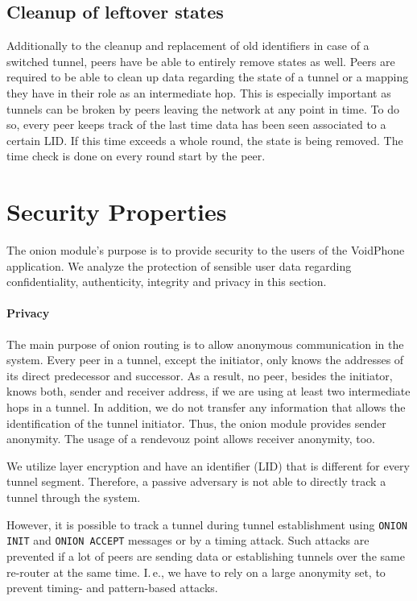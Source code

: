 \documentclass[paper=letter, fontsize=12pt]{article}
\begin{document}
\subsection{Cleanup of leftover states}
\label{sec:function:cleanup}
Additionally to the cleanup and replacement of old identifiers in case of a switched tunnel, peers have be able to entirely remove states as well. Peers are required to be able to clean up data regarding the state of a tunnel or a mapping they have in their role as an intermediate hop. This is especially important as tunnels can be broken by peers leaving the network at any point in time. To do so, every peer keeps track of the last time data has been seen associated to a certain LID. If this time exceeds a whole round, the state is being removed. The time check is done on every round start by the peer.

\section{Security Properties}
The onion module's purpose is to provide security to the users of the VoidPhone application.
We analyze the protection of sensible user data regarding confidentiality, authenticity, integrity and privacy in this section.

\paragraph{Privacy}
The main purpose of onion routing is to allow anonymous communication in the system.
Every peer in a tunnel, except the initiator, only knows the addresses of its direct predecessor and successor.
As a result, no peer, besides the initiator, knows both, sender and receiver address, if we are using at least two intermediate hops in a tunnel.
In addition, we do not transfer any information that allows the identification of the tunnel initiator.
Thus, the onion module provides sender anonymity.
The usage of a rendevouz point allows receiver anonymity, too.

We utilize layer encryption and have an identifier (LID) that is different for every tunnel segment.
Therefore, a passive adversary is not able to directly track a tunnel through the system.

However, it is possible to track a tunnel during tunnel establishment using \texttt{ONION INIT} and \texttt{ONION ACCEPT} messages or by a timing attack.
Such attacks are prevented if a lot of peers are sending data or establishing tunnels over the same re-router at the same time.
I.\,e., we have to rely on a large anonymity set, to prevent timing- and pattern-based attacks.
\end{document}
